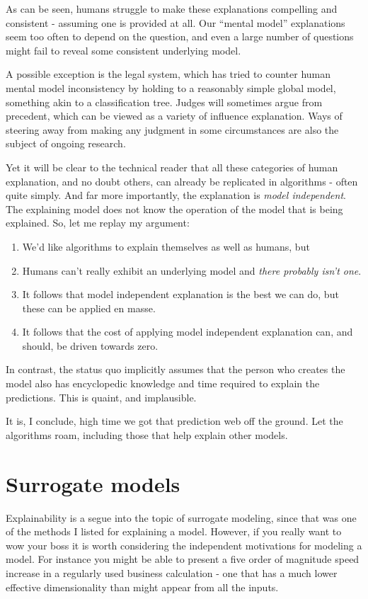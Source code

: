 As can be seen, humans struggle to make these explanations compelling and consistent - assuming one is provided at all. Our ``mental model'' explanations seem too often to depend on the question, and even a large number of questions might fail to reveal some consistent underlying model.

A possible exception is the legal system, which has tried to counter human mental model inconsistency by holding to a reasonably simple global model, something akin to a classification tree. Judges will sometimes argue from precedent, which can be viewed as a variety of influence explanation. Ways of steering away from making any judgment in some circumstances are also the subject of ongoing research. 

Yet it will be clear to the technical reader that all these categories of human explanation, and no doubt others, can already be replicated in algorithms - often quite simply. And far more importantly, the explanation is {\em model independent}. The explaining model does not know the operation of the model that is being explained. So, let me replay my argument:
\begin{enumerate}
  \item We'd like algorithms to explain themselves as well as humans, but
    \item Humans can't really exhibit an underlying model and {\em there probably isn't one}. 
    \item It follows that model independent explanation is the best we can do, but these can be applied en masse. 
    \item It follows that the cost of applying model independent explanation can, and should, be driven towards zero. 
\end{enumerate}

In contrast, the status quo implicitly assumes that the person who creates the model also has encyclopedic knowledge and time required to explain the predictions. This is quaint, and implausible. 

It is, I conclude, high time we got that prediction web off the ground. Let the algorithms roam, including those that help explain other models.


\section{Surrogate models}
\label{sec:surrogate}

Explainability is a segue into the topic of surrogate modeling, since that was one of the methods I listed for explaining a model. However, if you really want to wow your boss it is worth considering the independent motivations for modeling a model. For instance you might be able to present a five order of magnitude speed increase in a regularly used business calculation - one that has a much lower effective dimensionality than might appear from all the inputs. 

